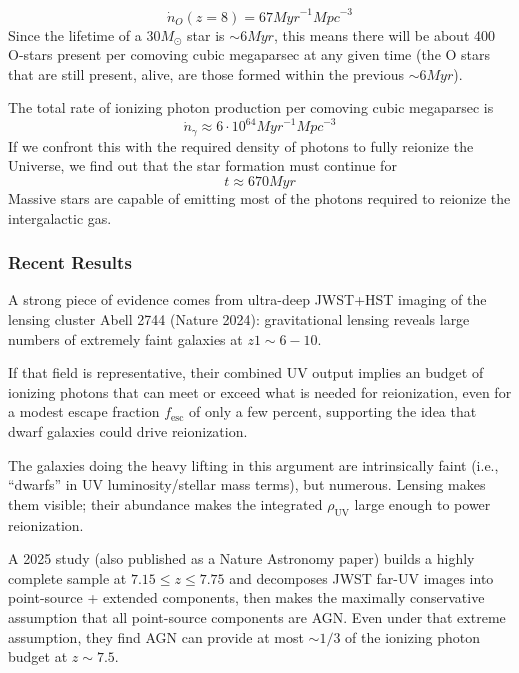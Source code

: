 \begin{equation*}
    \dot{n}_{O}(z=8) = 67\unit{Myr}^{-1}\unit{Mpc}^{-3}
\end{equation*}
Since the lifetime of a $30M_{\odot}$ star is $\sim 6\unit{Myr}$, this means there will be about 400 O-stars present per comoving cubic megaparsec at any given time (the O stars that are still present, alive, are those formed within the previous $\sim 6\unit{Myr}$).
\par The total rate of ionizing photon production per comoving cubic megaparsec is
\begin{equation*}
    \dot{n}_{\gamma} \approx 6\cdot 10^{64}\unit{Myr}^{-1}\unit{Mpc}^{-3}
\end{equation*}
If we confront this with the required density of photons to fully reionize the Universe, we find out that the star formation must continue for
\begin{equation*}
    t \approx 670\unit{Myr}
\end{equation*}
Massive stars are capable of emitting most of the photons required to reionize the intergalactic gas.

\subsubsection*{Recent Results}

A strong piece of evidence comes from ultra-deep JWST+HST imaging of the lensing cluster Abell 2744 (Nature 2024): gravitational lensing reveals large numbers of extremely faint galaxies at $z 1\sim 6-10$.
\par If that field is representative, their combined UV output implies an  budget of ionizing photons that can meet or exceed what is needed for reionization, even for a modest escape fraction $f_{\text{esc}}$ of only a few percent, supporting the idea that dwarf galaxies could drive reionization.
\par The galaxies doing the heavy lifting in this argument are intrinsically faint (i.e., “dwarfs” in UV luminosity/stellar mass terms), but numerous. Lensing makes them visible; their abundance makes the integrated $\rho_{\text{UV}}$ large enough to power reionization.
\par A 2025 study (also published as a Nature Astronomy paper) builds a highly complete sample at $7.15 \leq z \leq 7.75$ and decomposes JWST far-UV images into point-source + extended components, then makes the maximally conservative assumption that all point-source components are AGN. Even under that extreme assumption, they find AGN can provide at most $\sim1/3$ of the ionizing photon budget at $z \sim 7.5$.

